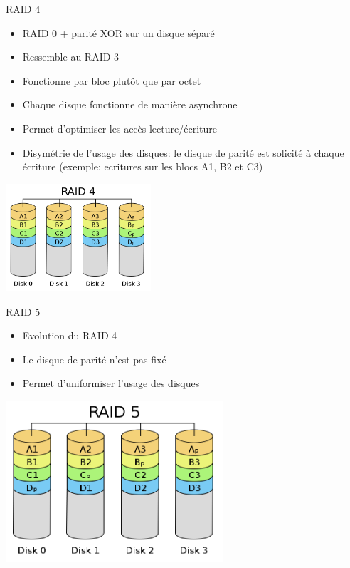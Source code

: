 \begin{frame}[fragile=singleslide]{RAID 4}
  \begin{itemize} 
  \item RAID 0 + parité XOR  sur un disque séparé
  \item Ressemble au RAID 3
  \item Fonctionne par bloc plutôt que par octet
  \item Chaque disque fonctionne de manière asynchrone
  \item Permet d'optimiser les accès lecture/écriture
  \item Disymétrie  de l'usage  des disques: le  disque de  parité est
    solicité à  chaque écriture (exemple: ecritures sur  les blocs A1,
    B2 et C3)
  \end{itemize} 
  \begin{center}
    \includegraphics[height=4cm]{pics/RAID_4}
  \end{center}
\end{frame}

\begin{frame}[fragile=singleslide]{RAID 5}
  \begin{itemize}
  \item Evolution du RAID 4
  \item Le disque de parité n'est pas fixé
  \item Permet d'uniformiser l'usage des disques
  \end{itemize} 
  \begin{center}
    \includegraphics[height=6cm]{pics/RAID_5}
  \end{center}
\end{frame}

